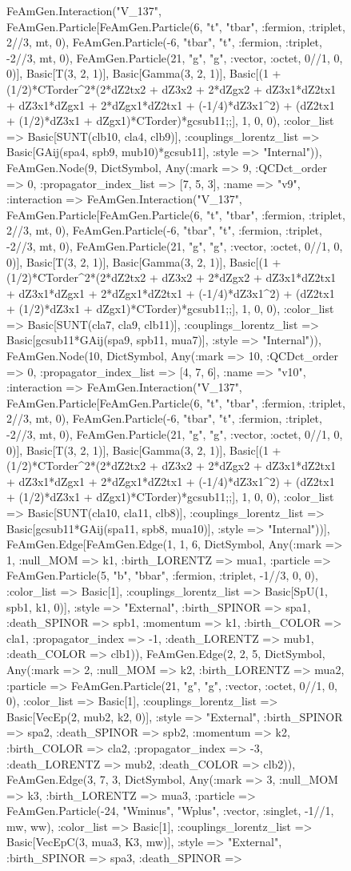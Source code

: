 \documentclass{revtex4}
\begin{document}
\begin{figure}[!htb]
\begin{center}
{FeAmGen.Interaction("V_137", FeAmGen.Particle[FeAmGen.Particle(6, "t", "tbar", :fermion, :triplet, 2//3, mt, 0), FeAmGen.Particle(-6, "tbar", "t", :fermion, :triplet, -2//3, mt, 0), FeAmGen.Particle(21, "g", "g", :vector, :octet, 0//1, 0, 0)], Basic[T(3, 2, 1)], Basic[Gamma(3, 2, 1)], Basic[(1 + (1/2)*CTorder^2*(2*dZ2tx2 + dZ3x2 + 2*dZgx2 + dZ3x1*dZ2tx1 + dZ3x1*dZgx1 + 2*dZgx1*dZ2tx1 + (-1/4)*dZ3x1^2) + (dZ2tx1 + (1/2)*dZ3x1 + dZgx1)*CTorder)*gcsub11;;], 1, 0, 0), :color_list => Basic[SUNT(clb10, cla4, clb9)], :couplings_lorentz_list => Basic[GAij(spa4, spb9, mub10)*gcsub11], :style => "Internal")), FeAmGen.Node(9, Dict{Symbol, Any}(:mark => 9, :QCDct_order => 0, :propagator_index_list => [7, 5, 3], :name => "v9", :interaction => FeAmGen.Interaction("V_137", FeAmGen.Particle[FeAmGen.Particle(6, "t", "tbar", :fermion, :triplet, 2//3, mt, 0), FeAmGen.Particle(-6, "tbar", "t", :fermion, :triplet, -2//3, mt, 0), FeAmGen.Particle(21, "g", "g", :vector, :octet, 0//1, 0, 0)], Basic[T(3, 2, 1)], Basic[Gamma(3, 2, 1)], Basic[(1 + (1/2)*CTorder^2*(2*dZ2tx2 + dZ3x2 + 2*dZgx2 + dZ3x1*dZ2tx1 + dZ3x1*dZgx1 + 2*dZgx1*dZ2tx1 + (-1/4)*dZ3x1^2) + (dZ2tx1 + (1/2)*dZ3x1 + dZgx1)*CTorder)*gcsub11;;], 1, 0, 0), :color_list => Basic[SUNT(cla7, cla9, clb11)], :couplings_lorentz_list => Basic[gcsub11*GAij(spa9, spb11, mua7)], :style => "Internal")), FeAmGen.Node(10, Dict{Symbol, Any}(:mark => 10, :QCDct_order => 0, :propagator_index_list => [4, 7, 6], :name => "v10", :interaction => FeAmGen.Interaction("V_137", FeAmGen.Particle[FeAmGen.Particle(6, "t", "tbar", :fermion, :triplet, 2//3, mt, 0), FeAmGen.Particle(-6, "tbar", "t", :fermion, :triplet, -2//3, mt, 0), FeAmGen.Particle(21, "g", "g", :vector, :octet, 0//1, 0, 0)], Basic[T(3, 2, 1)], Basic[Gamma(3, 2, 1)], Basic[(1 + (1/2)*CTorder^2*(2*dZ2tx2 + dZ3x2 + 2*dZgx2 + dZ3x1*dZ2tx1 + dZ3x1*dZgx1 + 2*dZgx1*dZ2tx1 + (-1/4)*dZ3x1^2) + (dZ2tx1 + (1/2)*dZ3x1 + dZgx1)*CTorder)*gcsub11;;], 1, 0, 0), :color_list => Basic[SUNT(cla10, cla11, clb8)], :couplings_lorentz_list => Basic[gcsub11*GAij(spa11, spb8, mua10)], :style => "Internal"))], FeAmGen.Edge[FeAmGen.Edge(1, 1, 6, Dict{Symbol, Any}(:mark => 1, :null_MOM => k1, :birth_LORENTZ => mua1, :particle => FeAmGen.Particle(5, "b", "bbar", :fermion, :triplet, -1//3, 0, 0), :color_list => Basic[1], :couplings_lorentz_list => Basic[SpU(1, spb1, k1, 0)], :style => "External", :birth_SPINOR => spa1, :death_SPINOR => spb1, :momentum => k1, :birth_COLOR => cla1, :propagator_index => -1, :death_LORENTZ => mub1, :death_COLOR => clb1)), FeAmGen.Edge(2, 2, 5, Dict{Symbol, Any}(:mark => 2, :null_MOM => k2, :birth_LORENTZ => mua2, :particle => FeAmGen.Particle(21, "g", "g", :vector, :octet, 0//1, 0, 0), :color_list => Basic[1], :couplings_lorentz_list => Basic[VecEp(2, mub2, k2, 0)], :style => "External", :birth_SPINOR => spa2, :death_SPINOR => spb2, :momentum => k2, :birth_COLOR => cla2, :propagator_index => -3, :death_LORENTZ => mub2, :death_COLOR => clb2)), FeAmGen.Edge(3, 7, 3, Dict{Symbol, Any}(:mark => 3, :null_MOM => k3, :birth_LORENTZ => mua3, :particle => FeAmGen.Particle(-24, "Wminus", "Wplus", :vector, :singlet, -1//1, mw, ww), :color_list => Basic[1], :couplings_lorentz_list => Basic[VecEpC(3, mua3, K3, mw)], :style => "External", :birth_SPINOR => spa3, :death_SPINOR => }
\end{center}
\end{figure}
\end{document}
